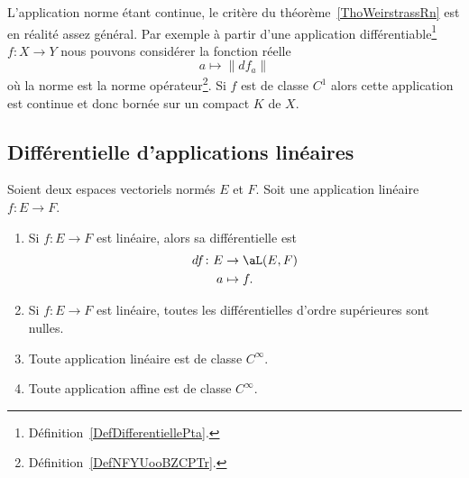 \begin{remark}      \label{RemATQVooDnZBbs}
	L'application norme étant continue, le critère du théorème~\ref{ThoWeirstrassRn} est en réalité assez général. Par exemple à partir d'une application différentiable\footnote{Définition~\ref{DefDifferentiellePta}.} \( f\colon X\to Y\)  nous pouvons considérer la fonction réelle
	\begin{equation}
		a\mapsto \|  df_a   \|
	\end{equation}
	où la norme est la norme opérateur\footnote{Définition~\ref{DefNFYUooBZCPTr}.}. Si \( f\) est de classe \( C^1\) alors cette application est continue et donc bornée sur un compact \( K\) de \( X\).
\end{remark}

\subsection{Différentielle d'applications linéaires}

\begin{lemma}       \label{LEMooZSNMooCfjzOB}
	Soient deux espaces vectoriels normés \( E\) et \( F\). Soit une application linéaire \( f\colon E\to F\).
	\begin{enumerate}
		\item
		      Si \( f\colon E\to F\) est linéaire, alors sa différentielle est
		      \begin{equation}
			      \begin{aligned}
				      df\colon E & \to  \aL(E,F) \\
				      a          & \mapsto f.
			      \end{aligned}
		      \end{equation}
		\item
		      Si \( f\colon E\to F\) est linéaire, toutes les différentielles d'ordre supérieures sont nulles.
		\item
		      Toute application linéaire est de classe \(  C^{\infty}\).
		\item
		      Toute application affine est de classe \(  C^{\infty}\).
	\end{enumerate}
\end{lemma}

